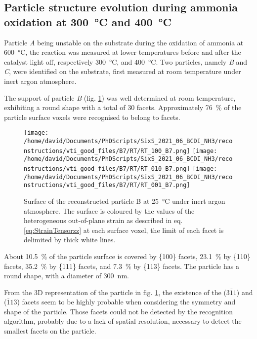 \subsection{Particle structure evolution during ammonia oxidation at \qty{300}{\degreeCelsius} and \qty{400}{\degreeCelsius}}\label{sec:BCDIAmmoniaOxidation}

Particle \textit{A} being unstable on the substrate during the oxidation of ammonia at \qty{600}{\degreeCelsius}, the reaction was measured at lower temperatures before and after the catalyst light off, respectively \qty{300}{\degreeCelsius}, and \qty{400}{\degreeCelsius}.
Two particles, namely \textit{B} and \textit{C}, were identified on the substrate, first measured at room temperature under inert argon atmosphere.

The support of particle \textit{B} (fig. \ref{fig:B7Facets}) was well determined at room temperature, exhibiting a round shape with a total of 30 facets.
Approximately \qty{76}{\percent} of the particle surface voxels were recognised to belong to facets.

\begin{figure}[!htb]
    \centering
    \texttt{[image: /home/david/Documents/PhDScripts/SixS\_2021\_06\_BCDI\_NH3/reconstructions/vti\_good\_files/B7/RT/RT\_100\_B7.png]}
    \texttt{[image: /home/david/Documents/PhDScripts/SixS\_2021\_06\_BCDI\_NH3/reconstructions/vti\_good\_files/B7/RT/RT\_010\_B7.png]}
    \texttt{[image: /home/david/Documents/PhDScripts/SixS\_2021\_06\_BCDI\_NH3/reconstructions/vti\_good\_files/B7/RT/RT\_001\_B7.png]}
    \caption{
        Surface of the reconstructed particle B at \qty{25}{\degreeCelsius} under inert argon atmosphere.
        The surface is coloured by the values of the heterogeneous out-of-plane strain as described in eq. \ref{eq:StrainTensorzz} at each surface voxel, the limit of each facet is delimited by thick white lines.
    }
    \label{fig:B7Facets}
\end{figure}

About \qty{10.5}{\percent} of the particle surface is covered by \{100\} facets, \qty{23.1}{\percent} by \{110\} facets, \qty{35.2}{\percent} by \{111\} facets, and \qty{7.3}{\percent} by \{113\} facets.
The particle has a round shape, with a diameter of \qty{300}{\nm}.

From the 3D representation of the particle in fig. \ref{fig:B7Facets}, the existence of the ($3\bar{1}1$) and ($\bar{1}13$) facets seem to be highly probable when considering the symmetry and shape of the particle.
Those facets could not be detected by the recognition algorithm, probably due to a lack of spatial resolution, necessary to detect the smallest facets on the particle.


